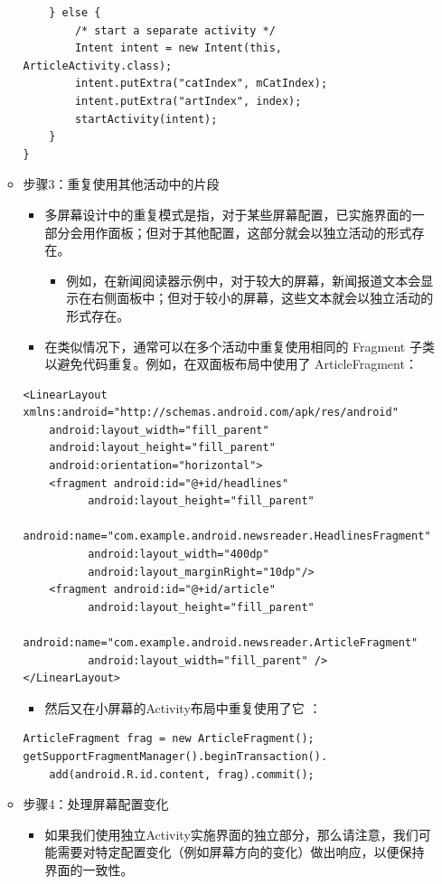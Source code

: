 \documentclass[9pt, b5paper]{article}
\begin{document}
\begin{enumerate}
\begin{itemize}
\begin{verbatim}
    } else {
        /* start a separate activity */
        Intent intent = new Intent(this, ArticleActivity.class);
        intent.putExtra("catIndex", mCatIndex);
        intent.putExtra("artIndex", index);
        startActivity(intent);
    }
}
\end{verbatim}
\item 步骤3：重复使用其他活动中的片段
\begin{itemize}
\item 多屏幕设计中的重复模式是指，对于某些屏幕配置，已实施界面的一部分会用作面板；但对于其他配置，这部分就会以独立活动的形式存在。
\begin{itemize}
\item 例如，在新闻阅读器示例中，对于较大的屏幕，新闻报道文本会显示在右侧面板中；但对于较小的屏幕，这些文本就会以独立活动的形式存在。
\end{itemize}
\item 在类似情况下，通常可以在多个活动中重复使用相同的 Fragment 子类以避免代码重复。例如，在双面板布局中使用了 ArticleFragment：
\end{itemize}
\begin{verbatim}
<LinearLayout xmlns:android="http://schemas.android.com/apk/res/android"
    android:layout_width="fill_parent"
    android:layout_height="fill_parent"
    android:orientation="horizontal">
    <fragment android:id="@+id/headlines"
          android:layout_height="fill_parent"
          android:name="com.example.android.newsreader.HeadlinesFragment"
          android:layout_width="400dp"
          android:layout_marginRight="10dp"/>
    <fragment android:id="@+id/article"
          android:layout_height="fill_parent"
          android:name="com.example.android.newsreader.ArticleFragment"
          android:layout_width="fill_parent" />
</LinearLayout>
\end{verbatim}
\begin{itemize}
\item 然后又在小屏幕的Activity布局中重复使用了它 ：
\end{itemize}
\begin{verbatim}
ArticleFragment frag = new ArticleFragment();
getSupportFragmentManager().beginTransaction().
    add(android.R.id.content, frag).commit();
\end{verbatim}
\item 步骤4：处理屏幕配置变化
\begin{itemize}
\item 如果我们使用独立Activity实施界面的独立部分，那么请注意，我们可能需要对特定配置变化（例如屏幕方向的变化）做出响应，以便保持界面的一致性。

\end{itemize}
\end{itemize}
\end{enumerate}
\end{document}
